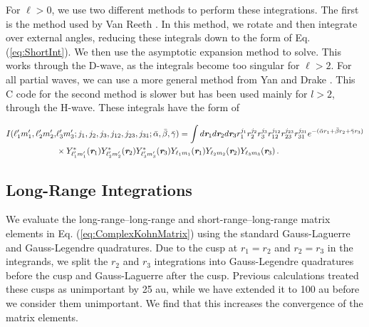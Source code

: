 \documentclass[reprint,showpacs,preprintnumbers,amsmath,amssymb,pra,aps]{revtex4-1}
\begin{document}
For $\ell > 0$, we use two different methods to perform these integrations. The first is the method used by Van Reeth \cite{VanReethThesis}. In this method, we rotate and then integrate over external angles, reducing these integrals down to the form of Eq. (\ref{eq:ShortInt}). We then use the asymptotic expansion method \cite{Drake1995} to solve. This works through the D-wave, as the integrals become too singular for $\ell > 2$. For all partial waves, we can use a more general method from Yan and Drake \cite{Yan1997}. This C code for the second method is slower but has been used mainly for $l > 2$, through the H-wave. These integrals have the form of
\begin{widetext}
\begin{align}
\label{eq:ShortIntGen}
\nonumber I(\ell_1^\prime m_1^\prime, \ell_2^\prime m_2^\prime, &\ell_3^\prime m_3^\prime; j_1,j_2,j_3,j_{12},j_{23},j_{31}; \bar{\alpha}, \bar{\beta}, \bar{\gamma}) = \int d \textit{\textbf{r}}_1 d \textit{\textbf{r}}_2 d \textit{\textbf{r}}_3
r_1^{j_1} r_2^{j_2} r_3^{j_3} r_{12}^{j_{12}}
r_{23}^{j_{23}} r_{31}^{j_{31}}
e^{-(\bar{\alpha} r_1 + \bar{\beta} r_2 + \bar{\gamma} r_3)} \\
& \times Y_{\ell_1^\prime m_1^\prime}^* (\textit{\textbf{r}}_1) Y_{\ell_2^\prime m_2^\prime}^* (\textit{\textbf{r}}_2) Y_{\ell_3^\prime m_3^\prime}^* (\textit{\textbf{r}}_3) Y_{\ell_1 m_1} (\textit{\textbf{r}}_1) Y_{\ell_2 m_2} (\textit{\textbf{r}}_2) Y_{\ell_3 m_3} (\textit{\textbf{r}}_3)\, .
\end{align}
\end{widetext}

\subsection{Long-Range Integrations}
\label{sec:LongInt}
We evaluate the long-range--long-range and short-range--long-range matrix elements in Eq. (\ref{eq:ComplexKohnMatrix}) using the standard Gauss-Laguerre and Gauss-Legendre quadratures. Due to the cusp at $r_1 = r_2$ and $r_2 = r_3$ in the integrands, we split the $r_2$ and $r_3$ integrations into Gauss-Legendre quadratures before the cusp and Gauss-Laguerre after the cusp. Previous calculations \cite{VanReeth2003,VanReeth2004} treated these cusps as unimportant by 25 au, while we have extended it to 100 au before we consider them unimportant. We find that this increases the convergence of the matrix elements.
\end{document}
